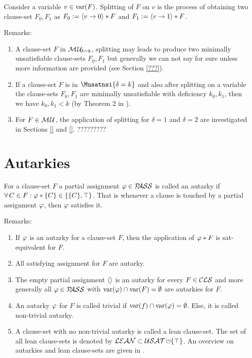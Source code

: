 \documentclass{report}
\begin{document}
\begin{defi}\label{def:splitting}
Consider a variable $v \in \operatorname{var}(F)$. Splitting of $F$ on $v$ is the process of obtaining two clause-set $F_0,F_1$ as  $F_0:=\langle v \rightarrow 0 \rangle * F$ and $F_1:=\langle v \rightarrow 1 \rangle * F$.
\end{defi}
Remarks:
  \begin{enumerate}
  \item A clause-set $F$ in $\mathcal{M\hspace{0.8pt}U}_{\!\delta=k}$, splitting may leads to produce two minimally unsatisfiable clause-sets $F_0,F_1$ but generally we can not say for sure unless more information are provided (see Section \ref{???}). 
  \item If a clause-set $F$ is in $\Musatnsi{\delta=k}$ and also after splitting on a variable the clause-sets $F_0,F_1$ are minimally unsatisfiable with deficiency $k_0, k_1$, then we have $k_0, k_1 < k$ (by Theorem 2 in \cite{h24}).
  \item For $F \in \mathcal{M\hspace{0.8pt}U}$, the application of splitting for $\delta=1$ and $\delta=2$ are investigated in Sections \ref{} and \ref{}. ?????????
  \end{enumerate}
\section{Autarkies}
\label{sec:autrk}

\begin{defi}\label{def:autarky}
For a clause-set $F$ a partial assignment $\varphi \in \mathcal{P\hspace{-0.32em}ASS}$ is called an autarky if $\forall\, C \in F : \varphi * \{ C \} \in \{ \{ C \}, \top \}$. That is whenever a clause is touched by a partial assignment $\varphi$, then $\varphi$ satisfies it.
\end{defi}
Remarks:
  \begin{enumerate}
  \item If $\varphi$ is an autarky for a clause-set $F$, then the application of $\varphi *F$ is sat-equivalent for $F$. 
  \item All satisfying assignment for $F$ are autarky.
  \item The empty partial assignment $\langle  \rangle$ is an autarky for every $F \in \mathcal{CLS}$ and more generally all $\varphi \in \mathcal{P\hspace{-0.32em}ASS}$ with $\operatorname{var}(\varphi) \cap \operatorname{var}(F) = \emptyset$ are autarkies for $F$. 
  \item An autarky $\varphi$ for $F$ is called trivial if $\operatorname{var}(f) \cap \operatorname{var}(\varphi) = \emptyset$. Else, it is called non-trivial autarky.
  \item A clause-set with no non-trivial autarky is called a lean clause-set. The set of all lean clause-sets is denoted by $\Lean \subset \Usat \addcup \set{\top}$. An overview on autarkies and lean clause-sets are given in \cite{h28, h25}. 
  \end{enumerate}
  
\end{document}

